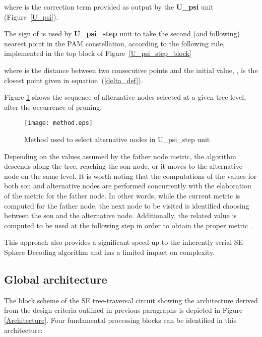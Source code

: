 \documentclass[12pt,onecolumn,draftclsnofoot]{IEEEtran}
\begin{document}
\noindent where  is the correction term provided as output by the 
\textbf{U\_psi} unit (Figure~\ref{U_psi}).

The sign of  is used by \textbf{U\_psi\_step} unit to take the second
(and following) nearest point in the PAM constellation, according to the 
following rule, implemented in the top block of Figure~\ref{U_psi_step_block}

\noindent where  is the distance between two consecutive points and the initial value,
, is the closest point given in equation~(\ref{delta_def}).

Figure \ref{method} shows the sequence of alternative 
nodes selected at a given tree level, after the occurrence of pruning.
\begin{figure}[t!]
    \begin{center}
    \texttt{[image: method.eps]} \caption{Method used to select alternative nodes in U\_psi\_step unit}
    \label{method}
    \end{center}
\end{figure}
Depending on the values assumed by the father node metric, the algorithm
descends along the tree, reaching the son node, or it moves to the 
alternative node on the same level.
It is worth noting that the computations of the  values for both
son and alternative nodes
are performed concurrently with the elaboration of the  metric for the
father node.
In other words, while the current metric is computed for the father node,
the next node to be visited is identified choosing
between the son and the alternative node. Additionally, the
related  value is computed to be used at the following step
in order to obtain the proper metric  .

This approach also provides a significant speed-up to the inherently
serial SE Sphere Decoding algorithm and  has a limited impact on
complexity.

\subsection{Global architecture}

The block scheme of the SE tree-traversal circuit showing the architecture 
derived from the design criteria outlined in previous paragraphs is depicted 
in Figure \ref{Architecture}.
Four fundamental processing blocks can be identified in this architecture:
\end{document}
